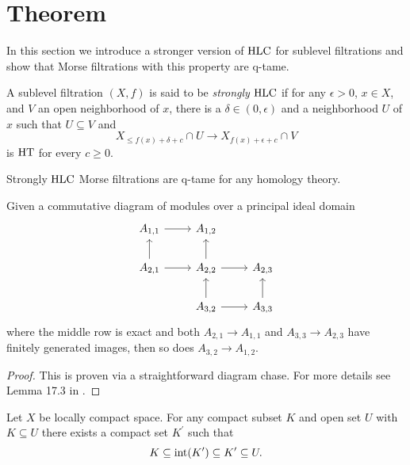 
\section{Theorem} \label{sec:theorem}

In this section we introduce a stronger version of $\mathrm{HLC}$ for sublevel filtrations and show that Morse filtrations with this property are q-tame.

\begin{defi}
	A sublevel filtration $(X,f)$ is said to be \textit{strongly} $\mathrm{HLC}$ if for any $\epsilon > 0$, $x \in X$, and $V$ an open neighborhood of $x$, there is a $\delta \in (0, \epsilon)$ and a neighborhood $U$ of $x$ such that $U \subseteq V$ and
	\begin{equation*}
	X_{\leq f(x) + \delta + c} \cap U \to X_{f(x) + \epsilon + c} \cap V
	\end{equation*}
	is $\mathrm{HT}$ for every $c \geq 0$.
\end{defi}

\begin{thm} \label{t:strong local connectenss implies q-tameness}
	Strongly $\mathrm{HLC}$ Morse filtrations are q-tame for any homology theory.
\end{thm}

\begin{lem} \label{l:commutative algebra}
	Given a commutative diagram of modules over a principal ideal domain
	\begin{equation*}
	\begin{tikzcd}
	A_{1,1} \arrow[r] & A_{1,2} & \\
	A_{2,1} \arrow[r] \arrow[u] & A_{2,2} \arrow[r] \arrow[u] & A_{2,3} \\
	& A_{3,2} \arrow[r] \arrow[u] & A_{3,3} \arrow[u]
	\end{tikzcd}
	\end{equation*}
	where the middle row is exact and both $A_{2,1} \to A_{1,1}$ and $A_{3,3} \to A_{2,3}$ have finitely generated images, then so does $A_{3,2} \to A_{1,2}$.
\end{lem}

\begin{proof}
	This is proven via a straightforward diagram chase. For more details see Lemma 17.3 in \cite{Bredon.1968}.
\end{proof}

\begin{lem} \label{l:neighborhood third}
	Let $X$ be locally compact space.
	For any compact subset $K$ and open set $U$ with $K \subseteq U$ there exists a compact set $K^\prime$ such that
	\begin{equation*}
	K \subseteq \operatorname{int}(K^\prime) \subseteq K^\prime \subseteq U.
	\end{equation*}
\end{lem}

